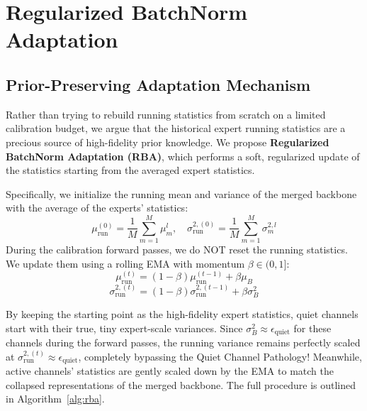 \documentclass{article}
\begin{document}
\section{Regularized BatchNorm Adaptation}
\label{sec:method}

\subsection{Prior-Preserving Adaptation Mechanism}
Rather than trying to rebuild running statistics from scratch on a limited calibration budget, we argue that the historical expert running statistics are a precious source of high-fidelity prior knowledge. We propose \textbf{Regularized BatchNorm Adaptation (RBA)}, which performs a soft, regularized update of the statistics starting from the averaged expert statistics.

Specifically, we initialize the running mean and variance of the merged backbone with the average of the experts' statistics:
\begin{equation}
  \mu_{\text{run}}^{(0)} = \frac{1}{M} \sum_{m=1}^M \mu^l_m, \quad \sigma^{2,(0)}_{\text{run}} = \frac{1}{M} \sum_{m=1}^M \sigma^{2,l}_m
\end{equation}
During the calibration forward passes, we do NOT reset the running statistics. We update them using a rolling EMA with momentum $\beta \in (0, 1]$:
\begin{equation}
  \mu_{\text{run}}^{(t)} = (1 - \beta) \mu_{\text{run}}^{(t-1)} + \beta \mu_B
\end{equation}
\begin{equation}
  \sigma^{2,(t)}_{\text{run}} = (1 - \beta) \sigma^{2,(t-1)}_{\text{run}} + \beta \sigma^2_B
\end{equation}

By keeping the starting point as the high-fidelity expert statistics, quiet channels start with their true, tiny expert-scale variances. Since $\sigma^2_{B} \approx \epsilon_{\text{quiet}}$ for these channels during the forward passes, the running variance remains perfectly scaled at $\sigma^{2,(t)}_{\text{run}} \approx \epsilon_{\text{quiet}}$, completely bypassing the Quiet Channel Pathology! Meanwhile, active channels' statistics are gently scaled down by the EMA to match the collapsed representations of the merged backbone. The full procedure is outlined in Algorithm~\ref{alg:rba}.
\end{document}
